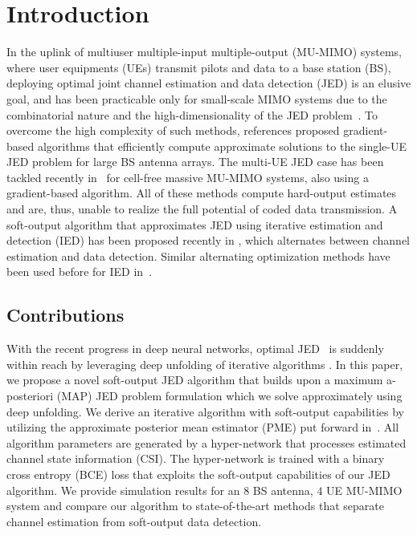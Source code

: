\section{Introduction}
%
In the uplink of multiuser multiple-input multiple-output (MU-MIMO) systems, where user equipments (UEs) transmit pilots and data to a base station (BS), deploying optimal joint channel estimation and data detection (JED) is an elusive goal, and has been practicable only for small-scale MIMO systems due to the combinatorial nature and the high-dimensionality of the JED problem~\cite{vikalo2006efficient,alshamary2015optimal,xu2008exact}.
%
To overcome the high complexity of such methods, references \cite{castanedaData2016,castaneda2017vlsi} proposed gradient-based algorithms that efficiently compute approximate solutions to the single-UE JED problem for large BS antenna arrays. 
%
The multi-UE JED case has been tackled recently in~\cite{songMinimizing2020} for cell-free massive MU-MIMO systems, also using a gradient-based algorithm. 
%
All of these methods compute hard-output estimates and are, thus, unable to realize the full potential of coded data transmission.
%
A soft-output algorithm that approximates JED using iterative estimation and detection (IED) has been proposed recently in \cite{heModeldriven2020}, which alternates between channel estimation and data detection. Similar alternating optimization methods have been used before for IED  in~\cite{Yilmaz19a,kofidis2017joint}. 

\subsection{Contributions}

With the recent progress in deep neural networks, optimal JED~\cite{vikalo2006efficient,alshamary2015optimal,xu2008exact} is suddenly within reach by leveraging deep unfolding of iterative algorithms \cite{hersheyDeep2014,balatsoukas-stimming19a,mongaAlgorithm2021,goutayDeep2020,heModeldriven2020}. 
%
In this paper, we propose a novel soft-output JED algorithm that  builds upon a maximum a-posteriori (MAP) JED problem formulation which we solve approximately using deep unfolding. 
%
We derive an iterative algorithm with soft-output capabilities by utilizing the approximate posterior mean estimator (PME) put forward in~\cite{jeonMismatched2020,jeon3542019}.
%
All algorithm parameters are generated by a hyper-network that processes estimated channel state information (CSI). The hyper-network is trained with a binary cross entropy (BCE) loss that exploits the soft-output capabilities of our JED algorithm.
%
We provide simulation results for an $8$ BS antenna, $4$ UE MU-MIMO system and compare our algorithm to state-of-the-art methods that separate channel estimation from soft-output data detection. 

